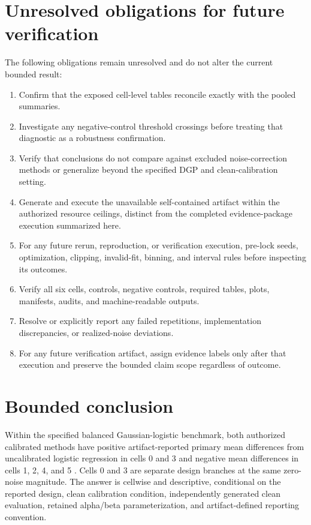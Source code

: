 \documentclass{article}
\begin{document}
\section{Unresolved obligations for future verification}
The following obligations remain unresolved and do not alter the current bounded result:
\begin{enumerate}
\item Confirm that the exposed cell-level tables reconcile exactly with the pooled summaries.
\item Investigate any negative-control threshold crossings before treating that diagnostic as a robustness confirmation.
\item Verify that conclusions do not compare against excluded noise-correction methods or generalize beyond the specified DGP and clean-calibration setting.
\item Generate and execute the unavailable self-contained artifact within the authorized resource ceilings, distinct from the completed evidence-package execution summarized here.
\item For any future rerun, reproduction, or verification execution, pre-lock seeds, optimization, clipping, invalid-fit, binning, and interval rules before inspecting its outcomes.
\item Verify all six cells, controls, negative controls, required tables, plots, manifests, audits, and machine-readable outputs.
\item Resolve or explicitly report any failed repetitions, implementation discrepancies, or realized-noise deviations.
\item For any future verification artifact, assign evidence labels only after that execution and preserve the bounded claim scope regardless of outcome.
\end{enumerate}

\section{Bounded conclusion}
Within the specified balanced Gaussian-logistic benchmark, both authorized calibrated methods have positive artifact-reported primary mean differences from uncalibrated logistic regression in cells 0 and 3 and negative mean differences in cells 1, 2, 4, and 5 \cite{exec}. Cells 0 and 3 are separate design branches at the same zero-noise magnitude. The answer is cellwise and descriptive, conditional on the reported design, clean calibration condition, independently generated clean evaluation, retained alpha/beta parameterization, and artifact-defined reporting convention.
\end{document}
